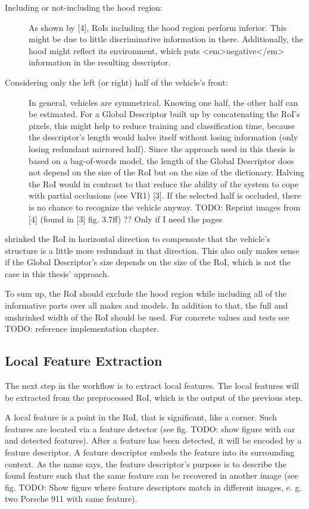 \begin{description}
  \item[Including or not-including the hood region:] As shown by [4], RoIs including the hood region perform inferior. This might be due to little discriminative information in there. Additionally, the hood might reflect its environment, which puts <em>negative</em> information in the resulting descriptor.
  \item[Considering only the left (or right) half of the vehicle's front:] In general, vehicles are symmetrical. Knowing one half, the other half can be estimated. For a Global Descriptor built up by concatenating the RoI’s pixels, this might help to reduce training and classification time, because the descriptor’s length would halve itself without losing information (only losing redundant mirrored half). Since the approach used in this thesis is based on a bag-of-words model, the length of the Global Descriptor does not depend on the size of the RoI but on the size of the dictionary. Halving the RoI would in contrast to that reduce the ability of the system to cope with partial occlusions (see VR1) [3]. If the selected half is occluded, there is no chance to recognize the vehicle anyway. TODO: Reprint images from [4] (found in [3] fig. 3.7ff) ?? Only if I need the pages
\end{description}
\citeauthor{petrovic2004analysis} \citep{petrovic2004analysis} shrinked the RoI in horizontal direction to compensate that the vehicle's structure is a little more redundant in that direction. This also only makes sense if the Global Descriptor's size depends on the size of the RoI, which is not the case in this thesis' approach.

To sum up, the RoI should exclude the hood region while including all of the informative parts over all makes and models. In addition to that, the full and unshrinked width of the RoI should be used. For concrete values and tests see TODO: reference implementation chapter.

\subsection{Local Feature Extraction}
The next step in the workflow is to extract local features. The local features will be extracted from the preprocessed RoI, which is the output of the previous step.

A local feature is a point in the RoI, that is significant, like a corner. Such features are located via a feature detector (see fig. TODO: show figure with car and detected features). After a feature has been detected, it will be encoded by a feature descriptor. A feature descriptor embeds the feature into its surrounding context. As the name says, the feature descriptor’s purpose is to describe the found feature such that the same feature can be recovered in another image (see fig. TODO: Show figure where feature descriptors match in different images, e. g. two Porsche 911 with same feature).

